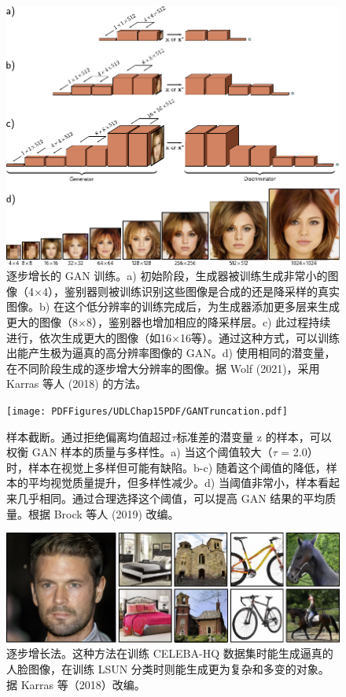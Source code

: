 \documentclass[lang=cn,newtx,10pt,scheme=chinese]{elegantbook}
\begin{document}
\begin{figure}[ht!]
\centering
\includegraphics[width=0.7\linewidth]{PDFFigures/UDLChap15PDF/GANProgressive.pdf}
\caption{逐步增长的 GAN 训练。a) 初始阶段，生成器被训练生成非常小的图像（4×4），鉴别器则被训练识别这些图像是合成的还是降采样的真实图像。b) 在这个低分辨率的训练完成后，为生成器添加更多层来生成更大的图像（8×8），鉴别器也增加相应的降采样层。c) 此过程持续进行，依次生成更大的图像（如16×16等）。通过这种方式，可以训练出能产生极为逼真的高分辨率图像的 GAN。d) 使用相同的潜变量，在不同阶段生成的逐步增大分辨率的图像。据 Wolf (2021)，采用 Karras 等人 (2018) 的方法。}
\end{figure}


\begin{figure}[ht!]
\centering
\texttt{[image: PDFFigures/UDLChap15PDF/GANTruncation.pdf]}
\caption{样本截断。通过拒绝偏离均值超过\(\tau\)标准差的潜变量 z 的样本，可以权衡 GAN 样本的质量与多样性。a) 当这个阈值较大（\(\tau\) = 2.0）时，样本在视觉上多样但可能有缺陷。b-c) 随着这个阈值的降低，样本的平均视觉质量提升，但多样性减少。d) 当阈值非常小，样本看起来几乎相同。通过合理选择这个阈值，可以提高 GAN 结果的平均质量。根据 Brock 等人 (2019) 改编。}
\end{figure}


\begin{figure}[ht!]
\centering
\includegraphics[width=0.7\linewidth]{PDFFigures/UDLChap15PDF/GANProgressiveResults.pdf}
\caption{逐步增长法。这种方法在训练 CELEBA-HQ 数据集时能生成逼真的人脸图像，在训练 LSUN 分类时则能生成更为复杂和多变的对象。据 Karras 等（2018）改编。}
\end{figure}
\end{document}
